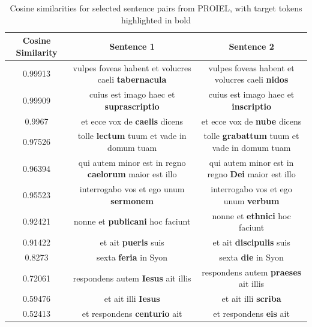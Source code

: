\begin{table}[ht]
    \centering
    \hspace*{-3cm}
    \begin{tabular}{c|c|c}
    Cosine Similarity & Sentence 1 & Sentence 2 \\ \hline
    0.99913 & vulpes foveas habent et volucres caeli \textbf{tabernacula} & vulpes foveas habent et volucres caeli \textbf{nidos} \\
    0.99909 & cuius est imago haec et \textbf{suprascriptio} & cuius est imago haec et \textbf{inscriptio} \\
    0.9967 & et ecce vox de \textbf{caelis} dicens & et ecce vox de \textbf{nube} dicens \\
    0.97526 & tolle \textbf{lectum} tuum et vade in domum tuam & tolle \textbf{grabattum} tuum et vade in domum tuam \\
    0.96394 & qui autem minor est in regno \textbf{caelorum} maior est illo & qui autem minor est in regno \textbf{Dei} maior est illo \\
    0.95523 & interrogabo vos et ego unum \textbf{sermonem} & interrogabo vos et ego unum \textbf{verbum} \\
    0.92421 & nonne et \textbf{publicani} hoc faciunt & nonne et \textbf{ethnici} hoc faciunt \\
    0.91422 & et ait \textbf{pueris} suis & et ait \textbf{discipulis} suis \\
    0.8273 & sexta \textbf{feria} in Syon & sexta \textbf{die} in Syon \\
    0.72061 & respondens autem \textbf{Iesus} ait illis & respondens autem \textbf{praeses} ait illis \\
    0.59476 & et ait illi \textbf{Iesus} & et ait illi \textbf{scriba} \\
    0.52413 & et respondens \textbf{centurio} ait & et respondens \textbf{eis} ait \\
    \end{tabular}
    \caption{Cosine similarities for selected sentence pairs from PROIEL, with target tokens highlighted in bold}
    \label{tab:cosSim1TokChangedProiel}
\end{table}

